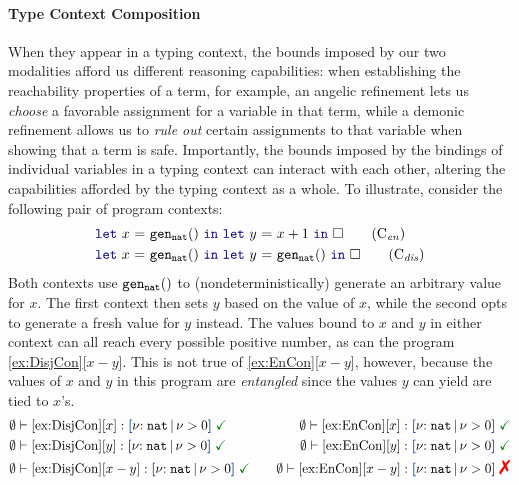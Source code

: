 \paragraph{Type Context Composition}
When they appear in a typing context, the bounds imposed by our two
modalities afford us different reasoning capabilities: when
establishing the reachability properties of a term, for example, an
angelic refinement lets us \emph{choose} a favorable assignment for a
variable in that term, while a demonic refinement allows us to
\emph{rule out} certain assignments to that variable when showing that
a term is safe.
Importantly, the bounds imposed by the bindings of individual
variables in a typing context can interact with each other, altering
the capabilities afforded by the typing context as a whole. To
illustrate, consider the following pair of program contexts:
\begin{align}
  &\zlet{x}{\Code{gen_{nat} () }}{\zlet{y}{x + 1}{\square}}
    \tag{C$_\mathit{en}$}\label{ex:EnCon} \\
  &\zlet{x}{\Code{gen_{nat} () }}{\zlet{y}{\Code{gen_{nat}()}}{\square}}
    \tag{C$_\mathit{dis}$}\label{ex:DisjCon}
\end{align}\noindent
Both contexts use ${\tt gen_{nat} ()}$ to (nondeterministically)
generate an arbitrary value for $x$. The first context then sets $y$
based on the value of $x$, while the second opts to generate a fresh
value for $y$ instead. The values bound to $x$ and $y$ in either
context can all reach every possible positive number, as can the
program \ref{ex:DisjCon}[$x - y$].  This is not true of
\ref{ex:EnCon}[$x - y$], however, because the values of $x$ and $y$ in
this program are \emph{entangled} since the values $y$ can yield are
tied to $x$'s.
\vspace{-0.2em}
\begin{align*}
  &\emptyset \vdash \text{\ref{ex:DisjCon}}[x] : \urt{\Nat}{\vnu > 0}
    \;\judgok \quad
  &\emptyset \vdash \text{\ref{ex:EnCon}}[x] : \urt{\Nat}{\vnu > 0}
    \;\judgok  \\
  & \emptyset \vdash \text{\ref{ex:DisjCon}}[y] : \urt{\Nat}{\vnu > 0}
  \;\judgok \quad
  &\emptyset \vdash \text{\ref{ex:EnCon}}[y] : \urt{\Nat}{\vnu > 0}
    \;\judgok \\
  & \emptyset \vdash \text{\ref{ex:DisjCon}}[x - y] : \urt{\Nat}{\vnu
    > 0} \;\judgok \quad & \emptyset \vdash \text{\ref{ex:EnCon}}[x - y] : \urt{\Nat}{\vnu > 0} \;\judgfail
\end{align*}\noindent
